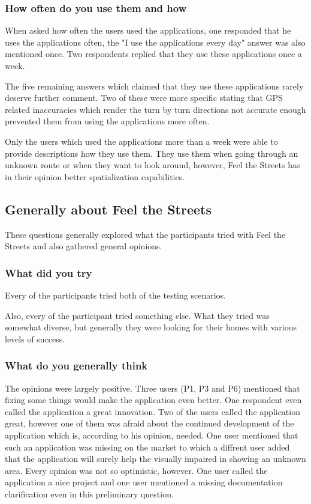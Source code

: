 \documentclass[nolof,digital]{fithesis3}
\begin{document}
\subsubsection{How often do you use them and how}
When asked how often the users used the applications, one responded that he uses the applications often, the "I use the applications every day" answer was also mentioned once. Two respondents replied that they use these applications once a week.

The five remaining answers which claimed that they use these applications rarely deserve further comment. Two of these were more specific stating that GPS related inaccuracies which render the turn by turn directions not accurate enough prevented them from using the applications more often.

Only the users which used the applications more than a week were able to provide descriptions how they use them. They use them when going through an unknown route or when they want to look around, however, Feel the Streets has in their opinion better spatialization capabilities.
\subsection{Generally about Feel the Streets}
These questions generally explored what the participants tried with Feel the Streets and also gathered general opinions.
\subsubsection{What did you try}
Every of the participants tried both of the testing scenarios.

Also, every of the participant tried something else. What they tried was somewhat diverse, but generally they were looking for their homes with various levels of success.
\subsubsection{What do you generally think}
The opinions were largely positive. Three users (P1, P3 and P6) mentioned that fixing some things would make the application even better. One respondent even called the application a great innovation. Two of the users called the application great, however one of them was afraid about the continued development of the application which is, according to his opinion, needed. One user mentioned that such an application was missing on the market to which a diffrent user added that the application will surely help the visually impaired in showing an unknown area. Every opinion was not so optimistic, however. One user called the application a nice project and one user mentioned a missing documentation clarification even in this preliminary question.
\end{document}
